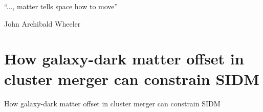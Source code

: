\documentclass[ucdthesis.tex]{subfiles}
\begin{document}
		
    
    \epigraph{``..., matter tells space how to move''}{John Archibald Wheeler} 
    \doublespacing
		\setcounter{chapter}{1}
		\chapter{How galaxy-dark matter offset in cluster merger can constrain
		SIDM}{How galaxy-dark matter offset in cluster merger can constrain SIDM}{}
		\label{chapter2}

						 

        
\end{document}
